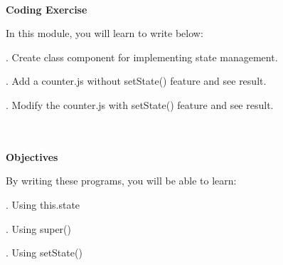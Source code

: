\documentclass{article}
\begin{document}

\noindent 

\noindent\\
\textbf{Coding Exercise}

\noindent 
In this module, you will learn to write below:

. Create class component for implementing state management.

. Add a counter.js without setState() feature and see result.

. Modify the counter.js with setState() feature and see result.

\noindent 
\\

\noindent \\
\textbf{Objectives}

\noindent 
By writing these programs, you will be able to learn:

. Using this.state

. Using super()

. Using setState()
\end{document}

